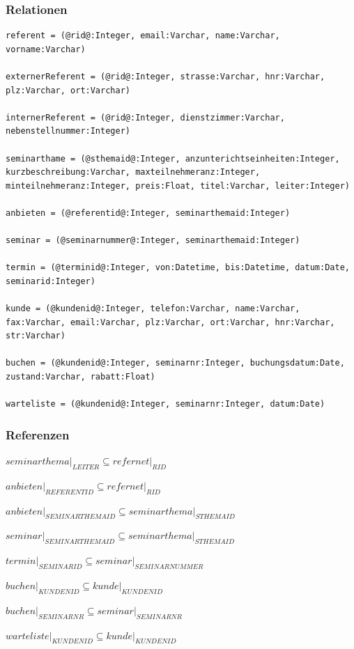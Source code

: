 \documentclass[10pt,a4paper]{article}
\begin{document}
\subsubsection{Relationen}
\begin{lstlisting}[]
referent = (@rid@:Integer, email:Varchar, name:Varchar, vorname:Varchar)

externerReferent = (@rid@:Integer, strasse:Varchar, hnr:Varchar, plz:Varchar, ort:Varchar)

internerReferent = (@rid@:Integer, dienstzimmer:Varchar, nebenstellnummer:Integer)

seminarthame = (@sthemaid@:Integer, anzunterichtseinheiten:Integer, kurzbeschreibung:Varchar, maxteilnehmeranz:Integer, minteilnehmeranz:Integer, preis:Float, titel:Varchar, leiter:Integer)

anbieten = (@referentid@:Integer, seminarthemaid:Integer)

seminar = (@seminarnummer@:Integer, seminarthemaid:Integer)

termin = (@terminid@:Integer, von:Datetime, bis:Datetime, datum:Date, seminarid:Integer)

kunde = (@kundenid@:Integer, telefon:Varchar, name:Varchar, fax:Varchar, email:Varchar, plz:Varchar, ort:Varchar, hnr:Varchar, str:Varchar)

buchen = (@kundenid@:Integer, seminarnr:Integer, buchungsdatum:Date, zustand:Varchar, rabatt:Float)

warteliste = (@kundenid@:Integer, seminarnr:Integer, datum:Date)
\end{lstlisting}

\subsubsection{Referenzen}
$seminarthema\vert_{LEITER} \subseteq refernet\vert_{RID}$

$anbieten\vert_{REFERENTID} \subseteq refernet\vert_{RID}$

$anbieten\vert_{SEMINARTHEMAID} \subseteq seminarthema\vert_{STHEMAID}$

$seminar\vert_{SEMINARTHEMAID} \subseteq seminarthema\vert_{STHEMAID}$

$termin\vert_{SEMINARID} \subseteq seminar\vert_{SEMINARNUMMER}$

$buchen\vert_{KUNDENID} \subseteq kunde\vert_{KUNDENID}$

$buchen\vert_{SEMINARNR} \subseteq seminar\vert_{SEMINARNR}$

$warteliste\vert_{KUNDENID} \subseteq kunde\vert_{KUNDENID}$
\end{document}
